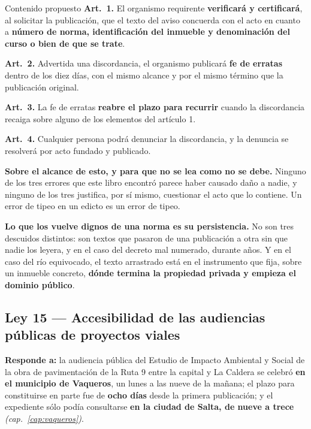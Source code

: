 \begin{ficha}{Contenido propuesto}
\textbf{Art.\ 1.} El organismo requirente \textbf{verificará y certificará}, al solicitar la
publicación, que el texto del aviso concuerda con el acto en cuanto a \textbf{número de norma,
identificación del inmueble y denominación del curso o bien de que se trate}.

\textbf{Art.\ 2.} Advertida una discordancia, el organismo publicará \textbf{fe de erratas}
dentro de los diez días, con el mismo alcance y por el mismo término que la publicación
original.

\textbf{Art.\ 3.} La fe de erratas \textbf{reabre el plazo para recurrir} cuando la
discordancia recaiga sobre alguno de los elementos del artículo 1.

\textbf{Art.\ 4.} Cualquier persona podrá denunciar la discordancia, y la denuncia se resolverá
por acto fundado y publicado.
\end{ficha}

\begin{cautela}
\textbf{Sobre el alcance de esto, y para que no se lea como no se debe.} Ninguno de los tres
errores que este libro encontró parece haber causado daño a nadie, y ninguno de los tres
justifica, por sí mismo, cuestionar el acto que lo contiene. Un error de tipeo en un edicto es
un error de tipeo.

\textbf{Lo que los vuelve dignos de una norma es su persistencia.} No son tres descuidos
distintos: son textos que pasaron de una publicación a otra sin que nadie los leyera, y en el
caso del decreto mal numerado, durante años. Y en el caso del río equivocado, el texto arrastrado está en el
instrumento que fija, sobre un inmueble concreto, \textbf{dónde termina la propiedad privada y
empieza el dominio público}.
\end{cautela}

\subsection{Ley 15 --- Accesibilidad de las audiencias públicas de proyectos viales}

\textbf{Responde a:} la audiencia pública del Estudio de Impacto Ambiental y Social de la obra
de pavimentación de la Ruta 9 entre la capital y La Caldera se celebró \textbf{en el municipio
de Vaqueros}, un lunes a las nueve de la mañana; el plazo para constituirse en parte fue de \textbf{ocho días} desde la primera publicación; y el expediente sólo podía consultarse
\textbf{en la ciudad de Salta, de nueve a trece} \textit{(cap.\ \ref{cap:vaqueros})}.

